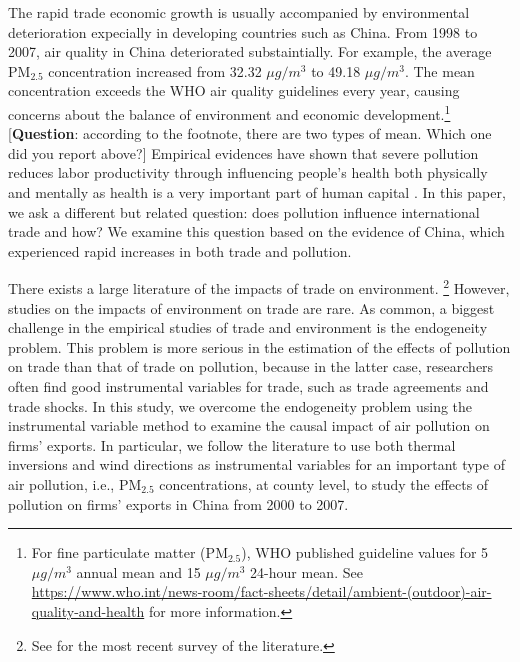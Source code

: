 \documentclass[12pt]{article}
\begin{document}
\label{sec:1} The rapid trade economic growth is usually accompanied by
environmental deterioration expecially in developing countries such as
China. From 1998 to 2007, air quality in China deteriorated substaintially.
For example, the average $\mathrm{PM_{2.5}}$ concentration increased from
32.32 $\mu g/m^{3}$ to 49.18 $\mu g/m^{3}$. The mean concentration exceeds
the WHO air quality guidelines every year, causing concerns about the
balance of environment and economic development.\footnote{%
For fine particulate matter ($\mathrm{PM_{2.5}}$), WHO published guideline
values for 5 $\mu g/m^{3}$ annual mean and 15 $\mu g/m^{3}$ 24-hour mean.
See %
\url{https://www.who.int/news-room/fact-sheets/detail/ambient-(outdoor)-air-quality-and-health}
for more information.} [\textbf{Question}: according to the footnote, there
are two types of mean. Which one did you report above?] Empirical evidences
have shown that severe pollution reduces labor productivity through
influencing people's health both physically and mentally as health is a very
important part of human capital %
\citep{graff2012impact,chang2016particulate,zhang2018impact,fu2021air,somanathan2021impact,Adhvaryu2022}%
. In this paper, we ask a different but related question: does pollution
influence international trade and how? We examine this question based on the
evidence of China, which experienced rapid increases in both trade and
pollution.

There exists a large literature of the impacts of trade on environment.%
\footnote{%
See \cite{cherniwchan2017trade} for the most recent survey of the literature.%
} However, studies on the impacts of environment on trade are rare. As
common, a biggest challenge in the empirical studies of trade and
environment is the endogeneity problem. This problem is more serious in the
estimation of the effects of pollution on trade than that of trade on
pollution, because in the latter case, researchers often find good
instrumental variables for trade, such as trade agreements and trade shocks.
In this study, we overcome the endogeneity problem using the instrumental
variable method to examine the causal impact of air pollution on firms'
exports. In particular, we follow the literature 
\citep{fu2021air,
khanna2021productivity, chen2022effect} to use both thermal inversions and
wind directions as instrumental variables for an important type of air
pollution, i.e., $\mathrm{PM_{2.5}}$ concentrations, at county level, to
study the effects of pollution on firms' exports in China from 2000 to 2007. 
\end{document}
